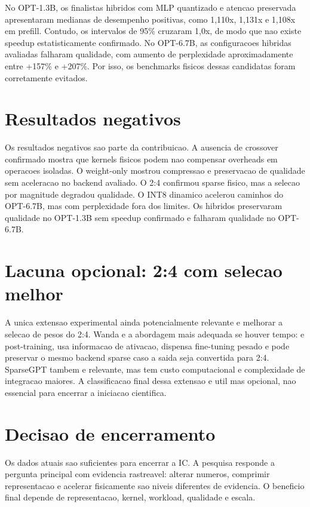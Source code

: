 No OPT-1.3B, os finalistas hibridos com MLP quantizado e atencao preservada
apresentaram medianas de desempenho positivas, como 1,110x, 1,131x e 1,108x em
prefill. Contudo, os intervalos de 95\% cruzaram 1,0x, de modo que nao existe
speedup estatisticamente confirmado. No OPT-6.7B, as configuracoes hibridas
avaliadas falharam qualidade, com aumento de perplexidade aproximadamente entre
+157\% e +207\%. Por isso, os benchmarks fisicos dessas candidatas foram
corretamente evitados.

\section{Resultados negativos}

Os resultados negativos sao parte da contribuicao. A ausencia de crossover
confirmado mostra que kernels fisicos podem nao compensar overheads em
operacoes isoladas. O weight-only mostrou compressao e preservacao de qualidade
sem aceleracao no backend avaliado. O 2:4 confirmou sparse fisico, mas a
selecao por magnitude degradou qualidade. O INT8 dinamico acelerou caminhos do
OPT-6.7B, mas com perplexidade fora dos limites. Os hibridos preservaram
qualidade no OPT-1.3B sem speedup confirmado e falharam qualidade no OPT-6.7B.

\section{Lacuna opcional: 2:4 com selecao melhor}

A unica extensao experimental ainda potencialmente relevante e melhorar a
selecao de pesos do 2:4. Wanda e a abordagem mais adequada se houver tempo:
e post-training, usa informacao de ativacao, dispensa fine-tuning pesado e pode
preservar o mesmo backend sparse caso a saida seja convertida para 2:4.
SparseGPT tambem e relevante, mas tem custo computacional e complexidade de
integracao maiores. A classificacao final dessa extensao e util mas opcional,
nao essencial para encerrar a iniciacao cientifica.

\section{Decisao de encerramento}

Os dados atuais sao suficientes para encerrar a IC. A pesquisa responde a
pergunta principal com evidencia rastreavel: alterar numeros, comprimir
representacao e acelerar fisicamente sao niveis diferentes de evidencia. O
beneficio final depende de representacao, kernel, workload, qualidade e escala.
